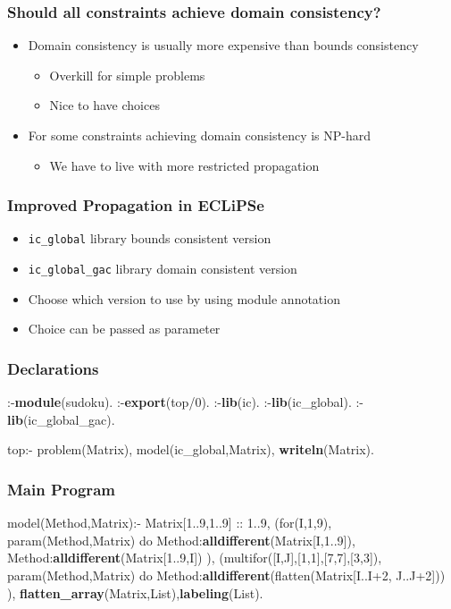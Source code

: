 \documentclass{beamer}
\begin{document}
\begin{frame}
\frametitle{Should all constraints achieve domain consistency?}
\begin{itemize}
\item Domain consistency is usually more expensive than bounds consistency
\begin{itemize}
\item Overkill for simple problems
\item Nice to have choices
\end{itemize}
\item For some constraints achieving domain consistency is NP-hard
\begin{itemize}
\item We have to live with more restricted propagation
\end{itemize}
\end{itemize}
\end{frame}

\begin{frame}
\frametitle{Improved Propagation in ECLiPSe}
\begin{itemize}
\item \texttt{ic\_global} library bounds consistent version
\item \texttt{ic\_global\_gac} library domain consistent version 
\item Choose which version to use by using module annotation
\item Choice can be passed as parameter
\end{itemize}
\end{frame}

\begin{frame}[fragile]
\frametitle{Declarations}
\begin{semiverbatim}
:-{\bf{}module}(sudoku).
:-{\bf{}export}(top/0).
:-{\bf{}lib}(ic).
:-{\bf{}lib}(ic_global).
:-{\bf{}lib}(ic_global_gac).

top:-
    problem(Matrix),
    model(ic_global,Matrix),
    {\bf{}writeln}(Matrix).
\end{semiverbatim}
\end{frame}


\begin{frame}[fragile]
\frametitle{Main Program}
\begin{semiverbatim}
model(Method,Matrix):-
    Matrix[1..9,1..9] :: 1..9,
    (for(I,1,9),
     param(Method,Matrix) do
        Method:{\bf{}alldifferent}(Matrix[I,1..9]),
        Method:{\bf{}alldifferent}(Matrix[1..9,I])
    ),
    (multifor([I,J],[1,1],[7,7],[3,3]),
     param(Method,Matrix) do
        Method:{\bf{}alldifferent}(flatten(Matrix[I..I+2,
                                       J..J+2]))
    ),
    {\bf{}flatten_array}(Matrix,List),{\bf{}labeling}(List).
\end{semiverbatim}
\end{frame}
\end{document}
